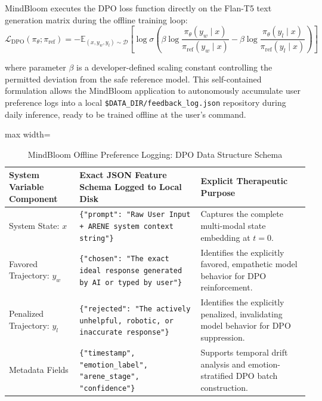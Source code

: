 \documentclass[12pt,twoside]{article}
\begin{document}
MindBloom executes the DPO loss function directly on the Flan-T5 text generation matrix during the offline training loop:
\begin{equation}
  \mathcal{L}_{\text{DPO}}(\pi_\theta; \pi_{\text{ref}}) = - \mathbb{E}_{(x, y_w, y_l) \sim \mathcal{D}} \left[ \log \sigma \left( \beta \log \frac{\pi_\theta(y_w \mid x)}{\pi_{\text{ref}}(y_w \mid x)} - \beta \log \frac{\pi_\theta(y_l \mid x)}{\pi_{\text{ref}}(y_l \mid x)} \right) \right]
\end{equation}

where parameter $\beta$ is a developer-defined scaling constant controlling the permitted deviation from the safe reference model. This self-contained formulation allows the MindBloom application to autonomously accumulate user preference logs into a local \texttt{\$DATA\_DIR/feedback\_log.json} repository during daily inference, ready to be trained offline at the user's command.

\begin{table}[htbp]
\centering
\Large
\renewcommand{\arraystretch}{2.4}
\setlength{\tabcolsep}{12pt}
\begin{adjustbox}{max width=\textwidth}
\begin{tabular}{|p{4.5cm}|p{6.5cm}|p{8.0cm}|}
\hline
\rowcolor{gray!20}
\textbf{System Variable Component} & \textbf{Exact JSON Feature Schema Logged to Local Disk} & \textbf{Explicit Therapeutic Purpose} \\
\hline
System State: $x$ & \texttt{\{"prompt": "Raw User Input + ARENE system context string"\}} & Captures the complete multi-modal state embedding at $t=0$. \\
\hline
Favored Trajectory: $y_w$ & \texttt{\{"chosen": "The exact ideal response generated by AI or typed by user"\}} & Identifies the explicitly favored, empathetic model behavior for DPO reinforcement. \\
\hline
Penalized Trajectory: $y_l$ & \texttt{\{"rejected": "The actively unhelpful, robotic, or inaccurate response"\}} & Identifies the explicitly penalized, invalidating model behavior for DPO suppression. \\
\hline
Metadata Fields & \texttt{\{"timestamp", "emotion\_label", "arene\_stage", "confidence"\}} & Supports temporal drift analysis and emotion-stratified DPO batch construction. \\
\hline
\end{tabular}
\end{adjustbox}
\caption{MindBloom Offline Preference Logging: DPO Data Structure Schema}
\label{tab:dpo_schema}
\end{table}
\end{document}
